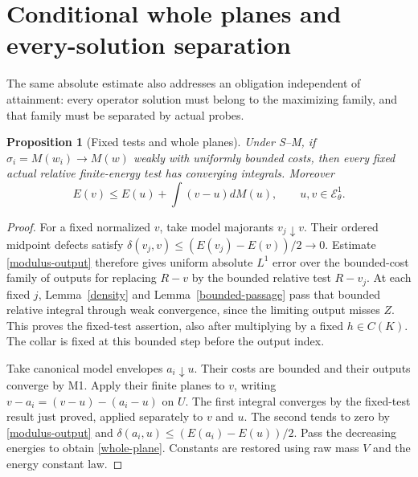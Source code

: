 \documentclass[10pt]{article}
\newtheorem{proposition}[theorem]{Proposition}
\newcommand{\E}{\mathcal E}
\begin{document}
\section{Conditional whole planes and every-solution separation}
The same absolute estimate also addresses an obligation independent of
attainment: every operator solution must belong to the maximizing family,
and that family must be separated by actual probes.

\begin{proposition}[Fixed tests and whole planes]\label{whole-planes}
Under S--M, if $\sigma_i=M(w_i)\to M(w)$ weakly with uniformly bounded
costs, then every \emph{fixed} actual relative finite-energy test has
converging integrals. Moreover
\begin{equation}\label{whole-plane}
 E(v)\leq E(u)+\int(v-u)dM(u),\qquad u,v\in\E^1_\theta.
\end{equation}
\end{proposition}
\begin{proof}
For a fixed normalized $v$, take model majorants $v_j\downarrow v$.
Their ordered midpoint defects satisfy
$\delta(v_j,v)\leq(E(v_j)-E(v))/2\to0$.
Estimate \eqref{modulus-output} therefore gives uniform absolute
$L^1$ error over the bounded-cost family of outputs for replacing
$R-v$ by the bounded relative test $R-v_j$.
At each fixed $j$, Lemma~\ref{density} and
Lemma~\ref{bounded-passage} pass that bounded relative integral through
weak convergence, since the limiting output misses $Z$. This proves
the fixed-test assertion, also after multiplying by a fixed $h\in C(K)$.
The collar is fixed at this bounded step before the output index.

Take canonical model envelopes $a_i\downarrow u$. Their costs are
bounded and their outputs converge by M1. Apply their finite planes
to $v$, writing $v-a_i=(v-u)-(a_i-u)$ on $U$.
The first integral converges by the fixed-test result just proved,
applied separately to $v$ and $u$. The second tends to zero by
\eqref{modulus-output} and
$\delta(a_i,u)\leq(E(a_i)-E(u))/2$.
Pass the decreasing energies to obtain \eqref{whole-plane}.
Constants are restored using raw mass $V$ and the energy constant law.
\end{proof}
\end{document}
